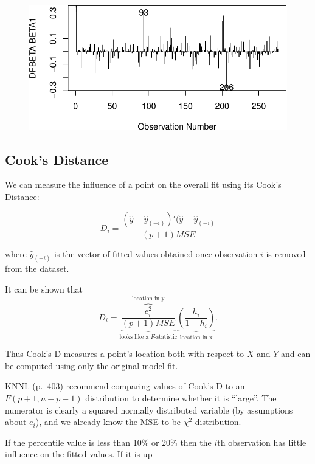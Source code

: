 \documentclass[
  letterpaper,
  DIV=11,
  numbers=noendperiod]{scrreport}
\begin{document}
\begin{figure}[H]

{\centering \includegraphics{week4/week4_files/figure-pdf/unnamed-chunk-14-1.pdf}

}

\end{figure}

\hypertarget{cooks-distance}{%
\subsection{Cook's Distance}\label{cooks-distance}}

We can measure the influence of a point on the overall fit using its
Cook's Distance:

\[D_i = \frac{(\hat y - \hat y_{(-i)})'(\hat y - \hat y_{(-i)}}{(p+1)MSE}\]

where \(\hat y_{(-i)}\) is the vector of fitted values obtained once
observation \(i\) is removed from the dataset.

It can be shown that
\[D_i = \underbrace{\frac{\overbrace{e_i^2}^{\text{location in y}}}{(p+1)MSE}}_{\text{looks like a } F\text{-statistic}}\underbrace{\left( \frac{h_i}{1-h_i} \right)}_{\text{location in x}}.\]

Thus Cook's D measures a point's location both with respect to \(X\) and
\(Y\) and can be computed using only the original model fit.

KNNL (p.~403) recommend comparing values of Cook's D to an
\(F(p+1, n-p-1)\) distribution to determine whether it is ``large''. The
numerator is clearly a squared normally distributed variable (by
assumptions about \(e_i\)), and we already know the MSE to be \(\chi^2\)
distribution.

If the percentile value is less than 10\% or 20\% then the \(i\)th
observation has little influence on the fitted values. If it is up
\end{document}
